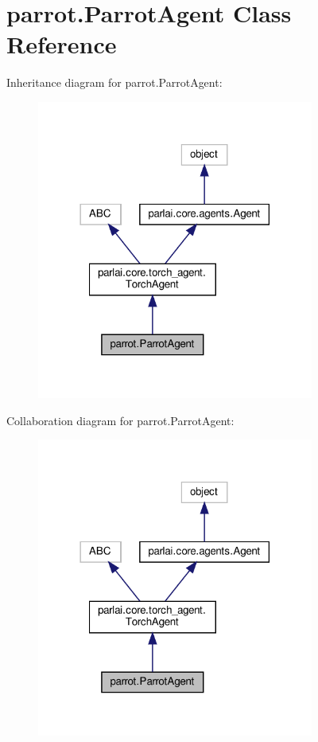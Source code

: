 \hypertarget{classparrot_1_1ParrotAgent}{}\section{parrot.\+Parrot\+Agent Class Reference}
\label{classparrot_1_1ParrotAgent}


Inheritance diagram for parrot.\+Parrot\+Agent\+:\nopagebreak
\begin{figure}[H]
\begin{center}
\leavevmode
\includegraphics[width=258pt]{d0/d39/classparrot_1_1ParrotAgent__inherit__graph}
\end{center}
\end{figure}


Collaboration diagram for parrot.\+Parrot\+Agent\+:
\nopagebreak
\begin{figure}[H]
\begin{center}
\leavevmode
\includegraphics[width=258pt]{d6/de4/classparrot_1_1ParrotAgent__coll__graph}
\end{center}
\end{figure}
